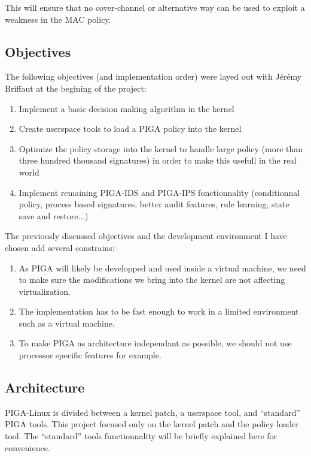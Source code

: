 \documentclass[pdftex,a4paper,titlepage,11pt]{article}
\begin{document}
\bigskip

This will ensure that no cover-channel or alternative way can be used to exploit
a weakness in the MAC policy.

\subsection{Objectives}

The following objectives (and implementation order) were layed out with Jérémy
Briffaut at the begining of the project:

\begin{enumerate}
	\item Implement a basic decision making algorithm in the kernel
	\item Create userspace tools to load a PIGA policy into the kernel
	\item Optimize the policy storage into the kernel to handle large policy
(more than three hundred thousand signatures) in order to make this usefull in
the real world
	\item Implement remaining PIGA-IDS and PIGA-IPS fonctionnality (conditionnal
policy, process based signatures, better audit features, rule learning, state
save and restore...)
\end{enumerate}

\smallskip

The previously discussed objectives and the development environment I have
chosen add several constrains:

\begin{enumerate}
	\item As PIGA will likely be developped and used inside a virtual machine,
we need to make sure the modifications we bring into the kernel are not
affecting virtualization.
	\item The implementation has to be fast enough to work in a limited
environment such as a virtual machine.
	\item To make PIGA as architecture independant as possible, we should not
use processor specific features for example.
\end{enumerate}


\subsection{Architecture}

PIGA-Linux is divided between a kernel patch, a userspace tool, and ``standard''
PIGA tools. This project focused only on the kernel patch and the policy loader
tool. The ``standard'' tools functionnality will be briefly explained here for
convenience.
\end{document}
